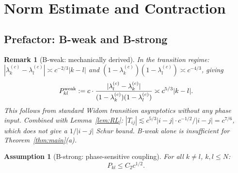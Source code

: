 \documentclass[12pt,a4paper]{article}
\newtheorem{remark}[theorem]{Remark}
\newtheorem{assumption}[theorem]{Assumption}
\newcommand{\lam}[1]{\lambda_{#1}^{(c)}}
\begin{document}
\section{Norm Estimate and Contraction}
\label{sec:norm}

\subsection{Prefactor: B-weak and B-strong}

\begin{remark}[B-weak: mechanically derived]\label{rem:Bweak}
In the transition regime:
$|\lam{k}-\lam{l}|\asymp c^{-2/3}|k-l|$
and $(1-\lam{k})(1-\lam{l})\asymp c^{-4/3}$,
giving
\[
  P_{kl}^{\rm weak}
  :=c\cdot\frac{|\lam{l}-\lam{k}|}{(1-\lam{k})(1-\lam{l})}
  \asymp c^{5/3}|k-l|.
\]
This follows from standard Widom transition asymptotics
without any phase input.
Combined with Lemma~\ref{lem:RL}:
$|T_{ij}|\lesssim c^{5/3}|i-j|\cdot c^{-1/2}/|i-j|=c^{7/6}$,
which does \emph{not} give a $1/|i-j|$ Schur bound.
B-weak alone is insufficient for Theorem~\ref{thm:main}(a).
\end{remark}

\begin{assumption}[B-strong: phase-sensitive coupling]
\label{ass:Bstrong}
For all $k\neq l$, $k,l\leq N$:
\[
  P_{kl}\leq C_2c^{1/2}.
\]
\end{assumption}
\end{document}
